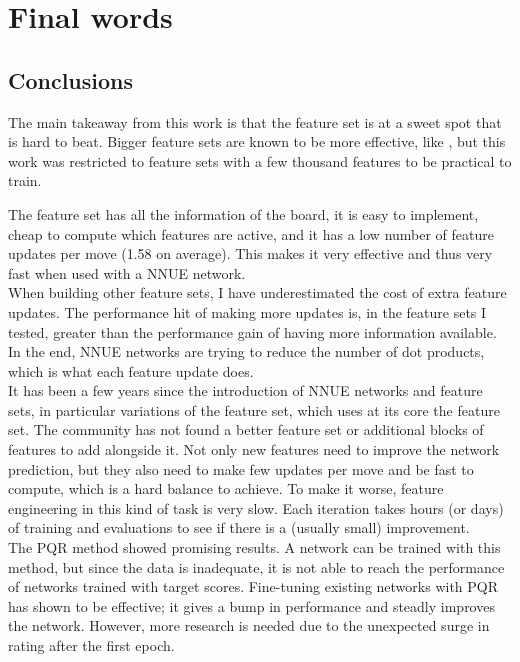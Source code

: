 \section{Final words}
\subsection{Conclusions}


The main takeaway from this work is that the  feature set is at a sweet spot that is hard to beat. Bigger feature sets are known to be more effective, like , but this work was restricted to feature sets with a few thousand features to be practical to train.

The feature set  has all the information of the board, it is easy to implement, cheap to compute which features are active, and it has a low number of feature updates per move (1.58 on average). This makes it very effective and thus very fast when used with a NNUE network. \\

When building other feature sets, I have underestimated the cost of extra feature updates. The performance hit of making more updates is, in the feature sets I tested, greater than the performance gain of having more information available. In the end, NNUE networks are trying to reduce the number of dot products, which is what each feature update does. \\

It has been a few years since the introduction of NNUE networks and feature sets, in particular variations of the  feature set, which uses at its core the  feature set. 
The community has not found a better feature set or additional blocks of features to add alongside it. Not only new features need to improve the network prediction, but they also need to make few updates per move and be fast to compute, which is a hard balance to achieve.
To make it worse, feature engineering in this kind of task is very slow. Each iteration takes hours (or days) of training and evaluations to see if there is a (usually small) improvement. \\

The PQR method showed promising results. A network can be trained with this method, but since the data is inadequate, it is not able to reach the performance of networks trained with target scores.
Fine-tuning existing networks with PQR has shown to be effective; it gives a bump in performance and steadly improves the network. However, more research is needed due to the unexpected surge in rating after the first epoch.

